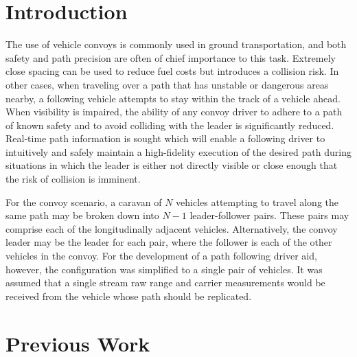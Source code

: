 \documentclass[twocolumn,10pt]{article}
\begin{document}

\section*{Introduction}

  The use of vehicle convoys is commonly used in ground transportation, and both safety and path precision are often of chief importance to this task.  Extremely close spacing can be used to reduce fuel costs but introduces a collision risk.  In other cases, when traveling over a path that has unstable or dangerous areas nearby, a following vehicle attempts to stay within the track of a vehicle ahead.  When visibility is impaired, the ability of any convoy driver to adhere to a path of known safety and to avoid colliding with the leader is significantly reduced.  Real-time path information is sought which will enable a following driver to intuitively and safely maintain a high-fidelity execution of the desired path during situations in which the leader is either not directly visible or close enough that the risk of collision is imminent.

  For the convoy scenario, a caravan of $N$ vehicles attempting to travel along the same path may be broken down into $N-1$ leader-follower pairs.  These pairs may comprise each of the longitudinally adjacent vehicles.  Alternatively, the convoy leader may be the leader for each pair, where the follower is each of the other vehicles in the convoy.  For the development of a path following driver aid, however, the configuration was simplified to a single pair of vehicles.  It was assumed that a single stream raw range and carrier measurements would be received from the vehicle whose path should be replicated.



\section*{Previous Work}
\end{document}
